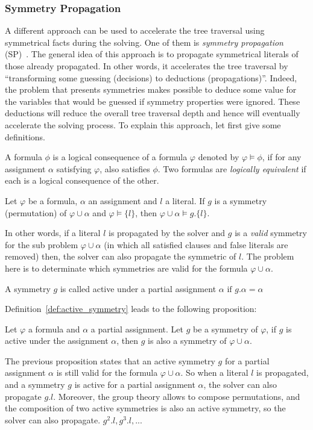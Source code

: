 \subsubsection{Symmetry Propagation}
A different approach can be used to accelerate the tree traversal using symmetrical facts during the solving.
One of them is \emph{symmetry propagation} (SP)~\cite{Devriendt12}.
The general idea of this approach is to propagate symmetrical literals of those already propagated.
In other words, it accelerates the tree traversal by ``transforming some guessing (decisions) to deductions (propagations)''.
Indeed, the problem that presents symmetries makes possible to deduce some value 
for the variables that would be guessed if symmetry properties were ignored.
These deductions will reduce the overall tree traversal depth and hence will eventually accelerate the solving process. To explain this approach, 
let first give some definitions.
\begin{definition}
 \label{def:logical_consequence}
 A formula $\phi$ is a logical consequence of a formula $\varphi$ denoted by $\varphi \models \phi$, if for any assignment
 $\alpha$ satisfying $\varphi$, also satisfies $\phi$. Two formulas are \emph{logically equivalent} if each is a logical
 consequence of the other.
\end{definition}
\begin{proposition}
 \label{prop:symmetry_propagation}
 Let $\varphi$ be a formula, $\alpha$ an assignment and $l$ a literal. 
 If $g$ is a symmetry (permutation) of $\varphi \cup \alpha$ and
 $\varphi \models \{l\}$, then $\varphi \cup \alpha \models g.\{l\}$.
\end{proposition}
In other words, if a literal $l$ is propagated by the solver and $g$ is a \emph{valid} symmetry for the
sub problem $\varphi \cup \alpha$ (in which all satisfied clauses and false literals are removed) then, the solver can
also propagate the symmetric of $l$. The problem here is to determinate which symmetries are valid for the formula
$\varphi \cup \alpha$.
\begin{definition}
 \label{def:active_symmetry}
 A symmetry $g$ is called active under a partial assignment $\alpha$ $\text{if } g.\alpha = \alpha$
\end{definition}
Definition~\ref{def:active_symmetry} leads to the following proposition:
\begin{proposition}
 \label{prop:active_symmetry}
 Let $\varphi$ a formula and $\alpha$ a partial assignment. Let $g$ be a symmetry of $\varphi$,
 if $g$ is active under the assignment $\alpha$, then $g$ is also a symmetry of $\varphi \cup \alpha$.
\end{proposition}
The previous proposition states that an active symmetry $g$ for a partial assignment $\alpha$ is still valid for
the formula $\varphi \cup \alpha$. So when a literal $l$ is propagated, and a symmetry $g$ is active for a
partial assignment $\alpha$, the solver can also propagate $g.l$. 
Moreover, the group theory allows to compose permutations, and the composition of two active symmetries is also an active symmetry,
so the solver can also propagate. $g^2.l, g^3.l, ... $

